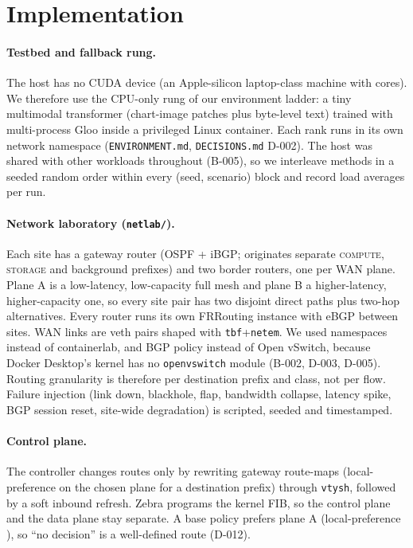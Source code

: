 \section{Implementation}
\label{sec:impl}

\paragraph{Testbed and fallback rung.}
The host has no CUDA device (an Apple-silicon laptop-class machine with  cores). We therefore use
the CPU-only rung of our environment ladder: a tiny multimodal transformer (chart-image patches plus
byte-level text) trained with multi-process Gloo inside a privileged Linux container. Each rank runs in its
own network namespace (\texttt{ENVIRONMENT.md}, \texttt{DECISIONS.md} D-002). The host was shared with
other workloads throughout (B-005), so we interleave methods in a seeded random order within every
(seed, scenario) block and record load averages per run.

\paragraph{Network laboratory (\texttt{netlab/}).}
Each site has a gateway router (OSPF + iBGP; originates separate \textsc{compute}, \textsc{storage} and
background prefixes) and two border routers, one per WAN plane. Plane A is a low-latency, low-capacity
full mesh and plane B a higher-latency, higher-capacity one, so every site pair has two disjoint direct
paths plus two-hop alternatives. Every router runs its own FRRouting instance with eBGP between sites.
WAN links are veth pairs shaped with \texttt{tbf}+\texttt{netem}. We used namespaces instead of
containerlab, and BGP policy instead of Open vSwitch, because Docker Desktop's kernel has no
\texttt{openvswitch} module (B-002, D-003, D-005). Routing granularity is therefore per
destination prefix and class, not per flow. Failure injection (link down, blackhole, flap, bandwidth
collapse, latency spike, BGP session reset, site-wide degradation) is scripted, seeded and timestamped.

\paragraph{Control plane.}
The controller changes routes only by rewriting gateway route-maps (local-preference  on the
chosen plane for a destination prefix) through \texttt{vtysh}, followed by a soft inbound refresh. Zebra
programs the kernel FIB, so the control plane and the data plane stay separate. A base policy prefers plane A
(local-preference ), so ``no decision'' is a well-defined route (D-012).

